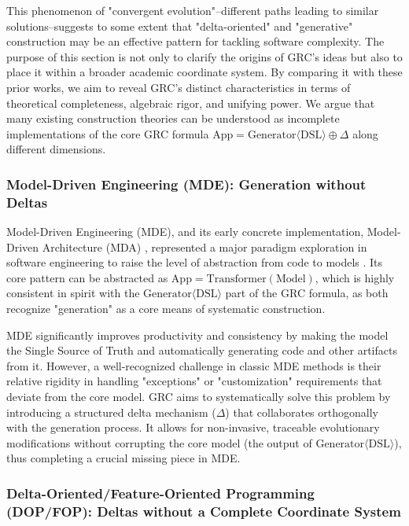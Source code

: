\documentclass[11pt]{article}
\begin{document}
This phenomenon of "convergent evolution"--different paths leading to similar solutions--suggests to some extent that "delta-oriented" and "generative" construction may be an effective pattern for tackling software complexity. The purpose of this section is not only to clarify the origins of GRC's ideas but also to place it within a broader academic coordinate system. By comparing it with these prior works, we aim to reveal GRC's distinct characteristics in terms of theoretical completeness, algebraic rigor, and unifying power. We argue that many existing construction theories can be understood as incomplete implementations of the core GRC formula $\text{App} = \text{Generator}\langle\text{DSL}\rangle \oplus \Delta$ along different dimensions.

\subsubsection{Model-Driven Engineering (MDE): Generation without Deltas}

Model-Driven Engineering (MDE), and its early concrete implementation, Model-Driven Architecture (MDA) \cite{omg2003}, represented a major paradigm exploration in software engineering to raise the level of abstraction from code to models \cite{schmidt2006}. Its core pattern can be abstracted as $\text{App} = \text{Transformer}(\text{Model})$, which is highly consistent in spirit with the $\text{Generator}\langle\text{DSL}\rangle$ part of the GRC formula, as both recognize "generation" as a core means of systematic construction.

MDE significantly improves productivity and consistency by making the model the Single Source of Truth and automatically generating code and other artifacts from it. However, a well-recognized challenge in classic MDE methods is their relative rigidity in handling "exceptions" or "customization" requirements that deviate from the core model. GRC aims to systematically solve this problem by introducing a structured delta mechanism ($\Delta$) that collaborates orthogonally with the generation process. It allows for non-invasive, traceable evolutionary modifications without corrupting the core model (the output of $\text{Generator}\langle\text{DSL}\rangle$), thus completing a crucial missing piece in MDE.

\subsubsection{Delta-Oriented/Feature-Oriented Programming (DOP/FOP): Deltas without a Complete Coordinate System}
\end{document}
